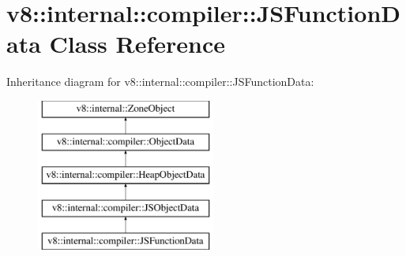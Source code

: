 \hypertarget{classv8_1_1internal_1_1compiler_1_1JSFunctionData}{}\section{v8\+:\+:internal\+:\+:compiler\+:\+:J\+S\+Function\+Data Class Reference}
\label{classv8_1_1internal_1_1compiler_1_1JSFunctionData}
Inheritance diagram for v8\+:\+:internal\+:\+:compiler\+:\+:J\+S\+Function\+Data\+:\begin{figure}[H]
\begin{center}
\leavevmode
\includegraphics[height=5.000000cm]{classv8_1_1internal_1_1compiler_1_1JSFunctionData}
\end{center}
\end{figure}
